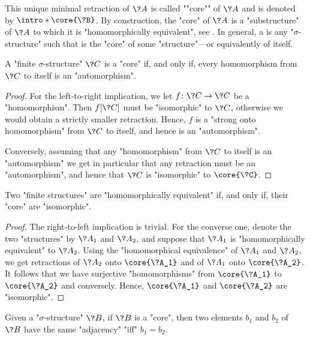 This unique minimal retraction of $\?A$ is called \AP""core"" of $\?A$ and
is denoted by \AP$\intro*\core{\?B}$.
By construction, the "core" of $\?A$ is a "substructure" of $\?A$ to which it is "homomorphically equivalent", see .
In general, a  is any "$\sigma$-structure" such that is the "core" of
some "structure"---or equivalently of itself.

\begin{proposition}
	\AP\label{prop:core-iff-hom-are-auto}
	A "finite $\sigma$-structure" $\?C$ is a "core" if, and only if, every
	homomorphism from $\?C$ to itself is an "automorphism".
\end{proposition}

\begin{proof}
	For the left-to-right implication,
	we let $f\colon \?C \to \?C$ be a "homomorphism".
	Then $f[\?C]$ must be "isomorphic" to $\?C$, otherwise we would obtain
	a strictly smaller retraction. Hence, $f$ is a "strong onto homomorphism"
	from $\?C$ to itself, and hence is an "automorphism".
	
	Conversely, assuming that any "homomorphism" from $\?C$ to itself is an "automorphism"
	we get in particular that any retraction must be an "automorphism", and
	hence that $\?C$ is "isomorphic" to $\core{\?C}$.
\end{proof}

\begin{proposition}
	Two "finite structures" are "homomorphically equivalent" if,
	and only if, their "core" are "isomorphic".
\end{proposition}

\begin{proof}
	The right-to-left implication is trivial.
	For the converse one, denote the two "structures" by $\?A_1$ and $\?A_2$,
	and suppose that $\?A_1$ is "homomorphically equivalent" to $\?A_2$.
	Using the "homomorphical equivalence" of $\?A_1$ and $\?A_2$,
	we get retractions of $\?A_2$ onto $\core{\?A_1}$ and of $\?A_1$ onto $\core{\?A_2}$.
	It follows that we have surjective "homomorphisms" from $\core{\?A_1}$ to $\core{\?A_2}$
	and conversely. Hence, $\core{\?A_1}$ and $\core{\?A_2}$ are "isomorphic".
\end{proof}

\begin{proposition}
	\AP\label{prop:adjacency-core}
	Given a "$\sigma$-structure" $\?B$, if $\?B$ is a "core", then
	two elements $b_1$ and $b_2$ of $\?B$ have the same "adjacency" "iff" $b_1 = b_2$.
\end{proposition}

